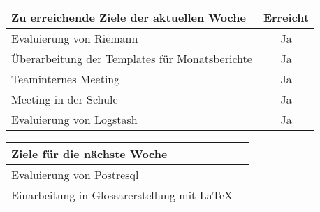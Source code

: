 \begin{tabularx}{\textwidth}{Xc}
    \arrayrulecolor{OliveGreen}
    \toprule
    {\bfseries Zu erreichende Ziele der aktuellen Woche} & {\bfseries Erreicht} \\
    \midrule[2pt]
    Evaluierung von Riemann                              &Ja                    \\
    \rowcolor{OliveGreen!15}
    Überarbeitung der Templates für Monatsberichte       &Ja                    \\
    \rowcolor{White}
    Teaminternes Meeting                                 &Ja                    \\
    \rowcolor{OliveGreen!15}
    Meeting in der Schule                                &Ja                    \\
    \rowcolor{White}
    Evaluierung von Logstash                             &Ja                    \\
    \bottomrule[2pt]
\end{tabularx}
%
\vspace{1cm}
%
\begin{tabularx}{\textwidth}{Xc}
    \arrayrulecolor{OliveGreen}
    \toprule
    {\bfseries Ziele für die nächste Woche}              &                      \\
    \midrule[2pt]
    Evaluierung von Postresql                            &                      \\
    \rowcolor{OliveGreen!15}
    Einarbeitung in Glossarerstellung mit \LaTeX{}       &                      \\
\end{tabularx}
